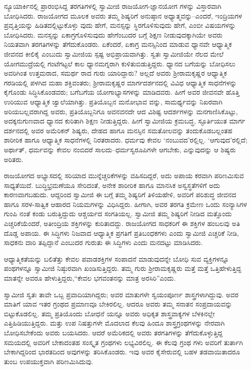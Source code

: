 ನ್ಯೂಯಾರ್ಕಿನಲ್ಲಿ ಪ್ರಾರಂಭಿಸಿದ್ದ ತರಗತಿಗಳಲ್ಲಿ ಸ್ವಾಮೀಜಿ ರಾಜಯೋಗ-ಜ್ಞಾನಯೋಗ ಗಳನ್ನು ವಿಸ್ತಾರವಾಗಿ ಬೋಧಿಸಿದರು. ರಾಜಯೋಗದ ಮೂಲಕ ಅವರು ತಮ್ಮ ಶಿಷ್ಯರಿಗೆ ಅನುಷ್ಠಾನ ಅಧ್ಯಾತ್ಮವನ್ನು–ಎಂದರೆ, ಇಂದ್ರಿಯಗಳ ಪ್ರವೃತ್ತಿಯನ್ನು ಹಿಡಿತದಲ್ಲಿಟ್ಟುಕೊಳ್ಳು ವುದು ಹೇಗೆ, ಮನಸ್ಸನ್ನು ಸ್ಥಿರಗೊಳಿಸುವುದು ಹೇಗೆ, ಎಂಬೀ ವಿಷಯಗಳನ್ನು ಬೋಧಿಸಿದರು. ಮನಸ್ಸನ್ನು ಏಕಾಗ್ರಗೊಳಿಸುವುದು ಹೇಗೆಂಬುದರ ಬಗ್ಗೆ ಶಿಕ್ಷಣ ನೀಡುವುದಕ್ಕಾಗಿಯೇ ಅವರು ನಿಯತವಾಗಿ ತರಗತಿಗಳನ್ನು ತೆಗೆದುಕೊಂಡರು. ಏಕೆಂದರೆ, ಏಕಾಗ್ರ ಮನಸ್ಸಿನಿಂದ ಮಾಡುವ ಧ್ಯಾನವೇ ಆಧ್ಯಾತ್ಮಿಕ ಜೀವನದ ಕೀಲಿಕೈ ಎಂಬುದು ಸ್ವಾಮೀಜಿಯ ಸ್ಪಷ್ಟ ಅಭಿಪ್ರಾಯವಾಗಿತ್ತು. ಸ್ವತಃ ಸ್ವಾಮೀಜಿಯೇ ನೆಲದ ಮೇಲೆ ಯೋಗಮುದ್ರೆಯಲ್ಲಿ ಗಂಟೆಗಟ್ಟಲೆ ಕಾಲ ಧ್ಯಾನಮಗ್ನರಾಗಿ ಕುಳಿತುಬಿಡುತ್ತಿದ್ದರು. ಧ್ಯಾನದ ಬಗೆಯನ್ನು ಬೋಧಿಸಲು ಅವರಿಗಿಂತ ಉತ್ತಮರಾದ, ಸಮರ್ಥ ರಾದ ಗುರು ಯಾರಿದ್ದಾರು? ಅಲ್ಲದೆ ಅವರು ಶ್ರೀರಾಮಕೃಷ್ಣರ ಆಧ್ಯಾತ್ಮಿಕ ಗರಡಿಯಲ್ಲಿ ಪಳಗಿದ ಮಹಾ ಶಕ್ತಿವಂತರು; ಶ್ರೀರಾಮಕೃಷ್ಣರ ಮಾರ್ಗದರ್ಶನದಲ್ಲಿ ವಿವಿಧ ಆಧ್ಯಾತ್ಮಿಕ ಸಾಧನೆಗಳನ್ನು ಕೈಗೊಂಡು ಸಿದ್ಧಿಸಿಕೊಂಡವರು; ಬಗೆಬಗೆಯ ಯೋಗಾಭ್ಯಾಸಗಳನ್ನು ಮಾಡಿದವರು. ಹೀಗೆ ಅವರ ಜೀವನವೇ ಹೊತ್ತಿ ಉರಿಯುವ ಆಧ್ಯಾತ್ಮಿಕ ಜ್ವಾಲೆಯಾಗಿತ್ತು. ಪ್ರತಿಯೊಬ್ಬನ ಮನೋಭಾವ ವನ್ನು, ಸಾಮರ್ಥ್ಯವನ್ನು ನಿಖರವಾಗಿ ಅರಿಯಬಲ್ಲವರಾಗಿದ್ದ ಅವರು, ಪ್ರತಿಯೊಬ್ಬನಿಗೂ ಅವನವನದೇ ಆದ ವಿಶಿಷ್ಟ ಆದರ್ಶಗಳನ್ನು ಮನಗಾಣಿಸಿಕೊಟ್ಟು, ಅದಕ್ಕನುಗುಣವಾದ ಧ್ಯಾನದ ಕುರಿತಾಗಿ ಶಿಕ್ಷಣ ನೀಡುತ್ತಿದ್ದರು. ಹೀಗೆ ಸ್ವಾಮೀಜಿಯ ಕ್ರಮಬದ್ಧ, ಸ್ಫೂರ್ತಿಯುತ ಮಾರ್ಗ ದರ್ಶನದಲ್ಲಿ ಅವರ ಅಮೆರಿಕನ್ ಶಿಷ್ಯರು, ದೇಹದ ಹಾಗೂ ಮನಸ್ಸಿನ ಸಮತೋಲವನ್ನು ತಂದುಕೊಡಬಲ್ಲಂತಹ ಶಾರೀರಿಕ ಹಾಗೂ ಆಧ್ಯಾತ್ಮಿಕ ಸಾಧನೆಗಳಲ್ಲಿ ನಿರತರಾದರು. ಧರ್ಮವು ಕೇವಲ ‘ನಂಬುವದ’ರಲ್ಲಿಲ್ಲ. ‘ಆಗುವುದ’ರಲ್ಲಿದೆ; ಅರ್ಥಾತ್, ಧರ್ಮವನ್ನು ಕೇವಲ ನಂಬಿದರೆ ಸಾಲದು–ಧರ್ಮಸ್ವರೂಪಿಗಳೇ ಆಗಬೇಕು, ಎನ್ನುವುದನ್ನು ಆ ಶಿಷ್ಯರು ಅರಿತರು.

ರಾಜಯೋಗದ ಅಭ್ಯಾಸದಲ್ಲಿ ಸರಿಯಾದ ಮುನ್ನೆಚ್ಚರಿಕೆಗಳನ್ನು ವಹಿಸದಿದ್ದರೆ, ಅದು ಅಪಾಯ ಕರವಾಗಿ ಪರಿಣಮಿಸುವ ಸಾಧ್ಯತೆಯಿದೆ. ಬುದ್ಧಿಭ್ರಮಣೆಯೂ ಸೇರಿದಂತೆ, ಅನೇಕ ಶಾರೀರಿಕ ಹಾಗೂ ಮಾನಸಿಕ ಅಸ್ವಸ್ಥತೆಗಳಿಗೆ ಅದು ಕಾರಣವಾಗಬಹುದು. ಆದ್ದರಿಂದ ಸ್ವಾಮೀಜಿ ಈ ಬಗ್ಗೆ ತಮ್ಮ ಶಿಷ್ಯರಿಗೆ ತಿಳಿಯಹೇಳಿ, ಅವರಿಗೆ ಪರಿಶುದ್ಧ ಜೀವನದ ಹಾಗೂ ಸರಳ-ಸಾತ್ವಿಕ ಆಹಾರದ ನಿಯಮಗಳನ್ನು ವಿಧಿಸಿದ್ದರು. ಹೀಗಾಗಿ, ಅವರ ತರಗತಿ ಕ್ರಮೇಣ ಒಂದು ಸಂನ್ಯಾಸಿಗಳ ಗುಂಪಿ ನಂತೆ ಕಂಡು ಬರುತ್ತಿದ್ದುದು ಆಶ್ಚರ್ಯದ ಸಂಗತಿಯಲ್ಲ. ಸ್ವಾಮೀಜಿ ತಮ್ಮ ಶಿಷ್ಯರಿಗೆ ನೀಡಿದ ಮತ್ತೊಂದು ಎಚ್ಚರಿಕೆಯೆಂದರೆ, ಅತೀಂದ್ರಿಯ ಶಕ್ತಿಗಳನ್ನು ಕುರಿತಾದದ್ದು. ರಾಜಯೋಗದ ಸಾಧಕರಿಗೆ ಈ ಶಕ್ತಿಗಳ ಹಂಬಲವು ಅತಿ ದೊಡ್ಡ ಅಪಾಯ. ಈ ಸಿದ್ಧಿಗಳು ನಿಜವಾದ ಆಧ್ಯಾತ್ಮಿಕ ಪ್ರಗತಿಗೆ ಪ್ರತಿಬಂಧಕಗಳು ಎಂದು ಸ್ವಾಮೀಜಿ ಎಚ್ಚರಿಕೆ ನೀಡಿ, ಸಾಧಕನು ದಾರಿ ತಪ್ಪಿದ್ದಾನೆ ಎಂಬುದರ ಗುರುತು ಈ ಸಿದ್ಧಿಗಳು ಎಂದು ಮನದಟ್ಟು ಮಾಡಿಸಿದರು.

ಆಧ್ಯಾತ್ಮಿಕತೆಯನ್ನು ಬಲಿತೆತ್ತು ಕೇವಲ ಪವಾಡಶಕ್ತಿಗಳ ಸಂಪಾದನೆ ಮಾಡುವುದನ್ನೇ ಬೋಧಿ ಸುವ ವ್ಯಕ್ತಿಗಳನ್ನೂ ಪಂಥಗಳನ್ನೂ ಸ್ವಾಮೀಜಿ ನಿಷ್ಠುರವಾಗಿ ಖಂಡಿಸುತ್ತಿದ್ದರು. ತಮ್ಮ ಗುರು ಶ್ರೀರಾಮಕೃಷ್ಣರು ಮತ್ತೆ ಮತ್ತೆ ಒತ್ತಿಹೇಳುತ್ತಿದ್ದ ಮಾತನ್ನೇ ಅವರೂ ಹೇಳುತ್ತಿದ್ದರು,“ಕೇವಲ ಭಗವಂತನನ್ನು ಮಾತ್ರ ಅರಸಿರಿ”ಎಂದು.

ಸ್ವಾಮೀಜಿ ಸ್ವತಃ ತಾವೇ ಒಬ್ಬ ಪ್ರವಾದಿಯಾಗಿದ್ದರು; ಅವರ ಮಾತುಗಳೇ ಸ್ವಯಂಪೂರ್ಣ ಶಾಸ್ತ್ರಗಳಾಗಿದ್ದುವು. ಅವರ ಮಾತಿಗೆ ಯಾವ ಇತರ ಗ್ರಂಥದ ಪ್ರಮಾಣವೂ ಬೇಕಿರಲಿಲ್ಲ. ಆದರೂ ಅವರು ತಮ್ಮ ಸನಾತನ ಸಂಪ್ರದಾಯವನ್ನು ಬಿಟ್ಟುಕೊಡಲಿಲ್ಲ. ತಮ್ಮ ಪ್ರತಿಯೊಂದು ಬೋಧನೆ ಯನ್ನೂ ಅವರು ಅಧಿಕೃತ ಶಾಸ್ತ್ರವಾಕ್ಯಗಳ ಬೆಳಕಿನಲ್ಲೇ ಎತ್ತಿಹಿಡಿಯುತ್ತಿದ್ದರು. ಮತ್ತು ಉಪ ನಿಷತ್ತುಗಳೇ ಮೊದಲಾದ ಕೆಲವು ಹಿಂದೂ ಶಾಸ್ತ್ರಗ್ರಂಥಗಳನ್ನು ನೇರವಾಗಿ ಬೋಧಿಸಬೇಕೆಂದು ಅವರು ಬಯಸಿದರು. ಆದರೆ ಅಮೆರಿಕದಲ್ಲಿ ಅವರು ತರಗತಿಗಳನ್ನು ತೆಗೆದುಕೊಳ್ಳುತ್ತಿದ್ದ ಸಮಯದಲ್ಲಿ ಅವರಿಗೆ ಬೇಕಾದಂತಹ ಸಂಸ್ಕೃತ ಗ್ರಂಥಗಳು ಲಭ್ಯವಿರಲಿಲ್ಲ. ಈ ಕೆಲವು ಗ್ರಂಥ ಗಳು ಅವರಿಗೆ ತುರ್ತಾಗಿ ಬೇಕಾಗಿದ್ದರಿಂದ ಭಾರತದಿಂದ ಅವುಗಳನ್ನು ತರಿಸಿಕೊಂಡರು. ಇವು ಅವರ ಕೈಸೇರುವಲ್ಲಿ ಬಹಳ ತಡವಾಯಿತಾದರೂ ತುಂಬ ಉಪಯುಕ್ತವಾಗಿ ಪರಿಣಮಿಸಿದುವು.

